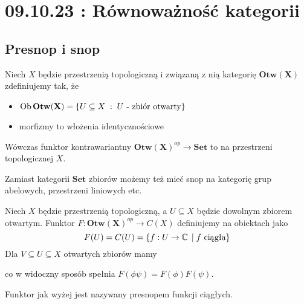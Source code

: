 \section{09.10.23 : Równoważność kategorii}

\subsection{Presnop i snop}

  Niech $X$ będzie przestrzenią topologiczną i związaną z nią kategorię $\mathbf{Otw(X)}$ zdefiniujemy tak, że
  \begin{itemize}
    \item $\operatorname{Ob}\mathbf{Otw(X)}=\{U\subseteq X\;:\;U\text{ - zbiór otwarty}\}$
    \item morfizmy to włożenia identycznościowe
  \end{itemize}
  Wówczas funktor kontrawariantny $\mathbf{Otw(X)}^{op}\to \mathbf{Set}$ to  na przestrzeni topologicznej $X$.

Zamiast kategorii $\mathbf{Set}$ zbiorów możemy też mieć snop na kategorię grup abelowych, przestrzeni liniowych etc.

\begin{example}
\item Niech $X$ będzie przestrzenią topologiczną, a $U\subseteq X$ będzie dowolnym zbiorem otwartym. Funktor $F:\mathbf{Otw(X)}^{op}\to {C(X)}$ definiujemy na obiektach jako
  $$F(U)=C(U)=\{f:U\to\operatorname{\mathbb{C}}\;|\;f\text{ ciągła}\}$$
  Dla $V\subseteq U\subseteq X$ otwartych zbiorów mamy

  \begin{center}
  \end{center}

  co w widoczny sposób spełnia $F(\phi\psi)=F(\phi)F(\psi)$.

  Funktor jak wyżej jest nazywany presnopem funkcji ciągłych.
\end{example}

